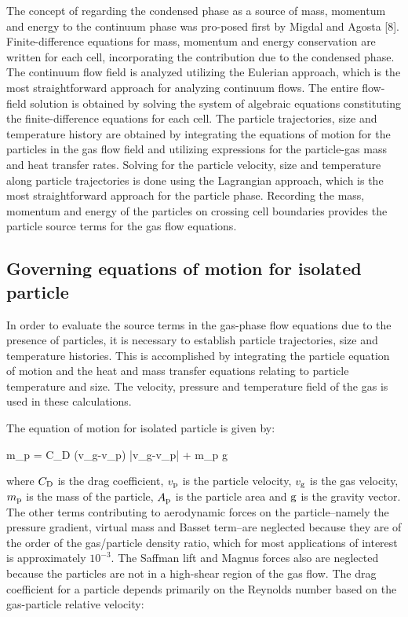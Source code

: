 The concept of regarding the condensed phase as a source of mass, momentum  and  energy  to  the  continuum phase was pro-posed first by Migdal and Agosta [8].  
Finite-difference equations for mass, momentum and energy conservation are written for each cell, incorporating the   contribution due to the condensed phase.
The continuum flow field is analyzed utilizing the Eulerian approach, which is the most straightforward approach  for analyzing continuum flows. The entire flow-field solution is obtained by solving the system of algebraic equations constituting the finite-difference equations for  each  cell.  
The particle trajectories, size and temperature history are obtained by integrating the equations of motion for the particles in the gas flow field and utilizing expressions for the particle-gas mass and heat transfer rates.
Solving for the particle velocity, size and temperature along particle trajectories is done using the Lagrangian approach, which is the most straightforward approach for the particle phase.
Recording the mass, momentum and energy of the particles on crossing cell boundaries provides the particle source terms  for the gas flow equations.

\subsection{Governing equations of motion for isolated particle}

In order to evaluate the source terms in the gas-phase flow equations due to the presence of particles, it is necessary to establish particle trajectories, size and temperature histories. This is accomplished by integrating the particle equation of motion and the heat and mass transfer equations relating to particle temperature and size. The velocity, pressure and temperature field of the gas is used in these calculations.

The equation of motion for isolated particle is given by:

%
\be
    {m_{\rm p}} 
    = {C_{\rm D}} \rho ({v_{\rm g}}-{v_{\rm p}}) |{v_{\rm g}}-{v_{\rm p}}| 
    + {m_{\rm p}} {\rm g}
  \label{eq_motion}
\ee
%

where ${C_{\rm D}}$ is the drag coefficient, ${v_{\rm p}}$ is the particle velocity, ${v_{\rm g}}$ is the gas velocity, ${m_{\rm p}}$ is the mass of the particle, ${A_{\rm p}}$ is the particle area and ${\rm g}$ is the gravity vector.
The other terms contributing to aerodynamic forces on the particle--namely the pressure gradient, virtual mass and Basset term--are neglected because they are of the order of the gas/particle density ratio, which for most applications of interest is approximately ${10^{-3}}$.
The Saffman lift and Magnus forces also are neglected because the particles are not in a high-shear region of the gas flow.
The drag coefficient for a particle depends primarily on the Reynolds number based on the gas-particle relative velocity:

